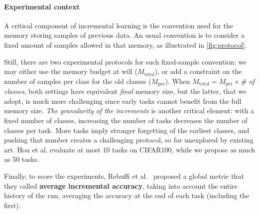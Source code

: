 \paragraph{Experimental context} A critical component of incremental learning is the convention used for
the memory storing samples of previous data. An usual convention is to consider a fixed amount of
samples allowed in that memory, as illustrated in \autoref{fig:protocol}.

Still, there are two experimental protocols for such fixed-sample convention: we may either use the
memory budget at will ($M_\mathrm{total}$), or add a constraint on the number of samples per class
for the old classes ($M_\mathrm{per}$). When $M_\mathrm{total}=M_\mathrm{per}\times$\textit{\# of
    classes}, both settings have equivalent \textit{final} memory size, but the latter, that we adopt,
is much more challenging since early tasks cannot benefit from the full memory size. \textit{The
    granularity of the increments} is another critical element: with a fixed number of classes,
increasing the number of tasks decreases the number of classes per task. More tasks imply stronger
forgetting of the earliest classes, and pushing that number creates a challenging protocol, so far
unexplored by existing art. Hou et al. evaluate at most 10 tasks on CIFAR100, while we propose as
much as 50 tasks.

Finally, to score the experiments, Rebuffi et al.~\citep{rebuffi2017icarl} proposed a global metric
that they called \textbf{average incremental accuracy}, taking into account the entire history of
the run, averaging the accuracy at the end of each task (including the first).

